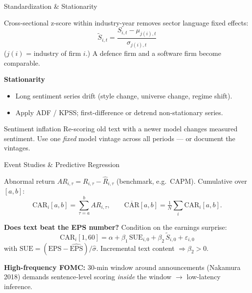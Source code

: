 \documentclass[9pt,t]{beamer}
\begin{document}
\begin{frame}{Standardization \& Stationarity}
\begin{underhood}
Cross-sectional z-score within industry-year removes sector language fixed effects:
\[
\tilde S_{i,t} = \frac{S_{i,t}-\mu_{j(i),t}}{\sigma_{j(i),t}}
\]
($j(i)$ = industry of firm $i$.) A defence firm and a software firm become comparable.
\end{underhood}

\medskip
\textbf{Stationarity}
\begin{itemize}\small
  \item Long sentiment series drift (style change, universe change, regime shift).
  \item Apply ADF / KPSS; first-difference or detrend non-stationary series.
\end{itemize}

\medskip
\begin{alertblock}{Sentiment inflation}
Re-scoring old text with a newer model changes measured sentiment. Use one
\emph{fixed} model vintage across all periods --- or document the vintages.
\end{alertblock}
\end{frame}

\begin{frame}{Event Studies \& Predictive Regression}
\begin{underhood}
Abnormal return $AR_{i,\tau}=R_{i,\tau}-\hat R_{i,\tau}$ (benchmark, e.g.\ CAPM).
Cumulative over $[a,b]$:
\[
\mathrm{CAR}_i[a,b]=\sum_{\tau=a}^{b}AR_{i,\tau},\qquad
\overline{\mathrm{CAR}}[a,b]=\tfrac1N\sum_i \mathrm{CAR}_i[a,b].
\]
\end{underhood}

\medskip
\textbf{Does text beat the EPS number?} Condition on the earnings surprise:
\[
\mathrm{CAR}_i[1,60]=\alpha+\beta_1\,\mathrm{SUE}_{i,0}+\beta_2\,\tilde S_{i,0}+\varepsilon_{i,0}
\]
with $\mathrm{SUE}=(\mathrm{EPS}-\widehat{\mathrm{EPS}})/\hat\sigma$.
Incremental text content $\Rightarrow \hat\beta_2>0$.

\medskip
\textbf{High-frequency FOMC:} 30-min window around announcements (Nakamura 2018)
demands sentence-level scoring \emph{inside} the window $\to$ low-latency inference.
\end{frame}
\end{document}
